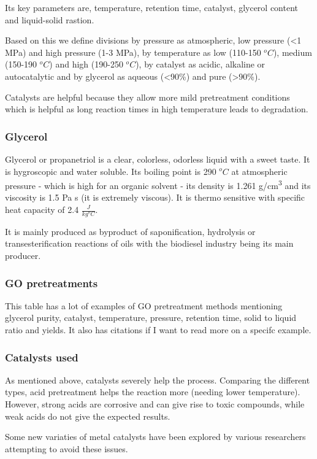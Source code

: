 \documentclass[11pt]{article}
\begin{document}
Its key parameters are, temperature, retention time, catalyst, glycerol content and liquid-solid rastion.

Based on this we define divisions by pressure as atmospheric, low pressure (<1 MPa) and high pressure (1-3 MPa), by temperature as low (110-150 \(^oC\)), medium (150-190 \(^oC\)) and high (190-250 \(^oC\)), by catalyst as acidic, alkaline or autocatalytic and by glycerol as aqueous (<90\%) and pure (>90\%).

Catalysts are helpful because they allow more mild pretreatment conditions which is helpful as long reaction times in high temperature leads to degradation.
\subsubsection{Glycerol}
\label{sec:orge15087a}
Glycerol or propanetriol is a clear, colorless, odorless liquid with a sweet taste. It is hygroscopic and water soluble. Its boiling point is 290 \(^oC\) at atmospheric pressure - which is high for an organic solvent - its density is 1.261 g/cm\textsuperscript{3} and its viscosity is 1.5 Pa s (it is extremely viscous). It is thermo sensitive with specific heat capacity of 2.4 \(\frac{J}{kg ^oC}\).

It is mainly produced as byproduct of saponification, hydrolysis or transesterification reactions of oils with the biodiesel industry being its main producer.
\subsubsection{GO pretreatments}
\label{sec:org7199358}
This table has a lot of examples of GO pretreatment methods mentioning glycerol purity, catalyst, temperature, pressure, retention time, solid to liquid ratio and yields. It also has citations if I want to read more on a specifc example.
\subsubsection{Catalysts used}
\label{sec:org4c0a2df}
As mentioned above, catalysts severely help the process. Comparing the different types, acid pretreatment helps the reaction more (needing lower temperature). However, strong acids are corrosive and can give rise to toxic compounds, while weak acids do not give the expected results.

Some new variaties of metal catalysts have been explored by various researchers attempting to avoid these issues.
\end{document}
